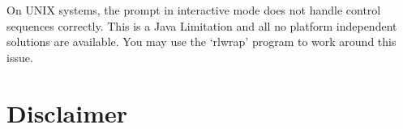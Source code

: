 On UNIX systems, the prompt in interactive mode does not handle control sequences correctly. This is a Java Limitation and all no platform independent solutions are available. You may use the `rlwrap' program to work around this issue.

%


\section{Disclaimer}



